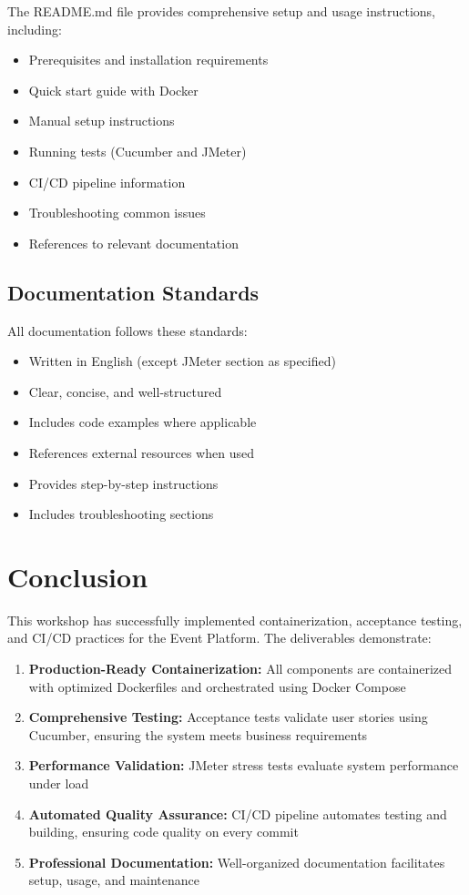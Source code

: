 \documentclass[12pt,a4paper]{article}
\begin{document}
The README.md file provides comprehensive setup and usage instructions, including:

\begin{itemize}
    \item Prerequisites and installation requirements
    \item Quick start guide with Docker
    \item Manual setup instructions
    \item Running tests (Cucumber and JMeter)
    \item CI/CD pipeline information
    \item Troubleshooting common issues
    \item References to relevant documentation
\end{itemize}

\subsection{Documentation Standards}

All documentation follows these standards:
\begin{itemize}
    \item Written in English (except JMeter section as specified)
    \item Clear, concise, and well-structured
    \item Includes code examples where applicable
    \item References external resources when used
    \item Provides step-by-step instructions
    \item Includes troubleshooting sections
\end{itemize}

\section{Conclusion}

This workshop has successfully implemented containerization, acceptance testing, and CI/CD practices for the Event Platform. The deliverables demonstrate:

\begin{enumerate}
    \item \textbf{Production-Ready Containerization:} All components are containerized with optimized Dockerfiles and orchestrated using Docker Compose
    \item \textbf{Comprehensive Testing:} Acceptance tests validate user stories using Cucumber, ensuring the system meets business requirements
    \item \textbf{Performance Validation:} JMeter stress tests evaluate system performance under load
    \item \textbf{Automated Quality Assurance:} CI/CD pipeline automates testing and building, ensuring code quality on every commit
    \item \textbf{Professional Documentation:} Well-organized documentation facilitates setup, usage, and maintenance
\end{enumerate}
\end{document}
